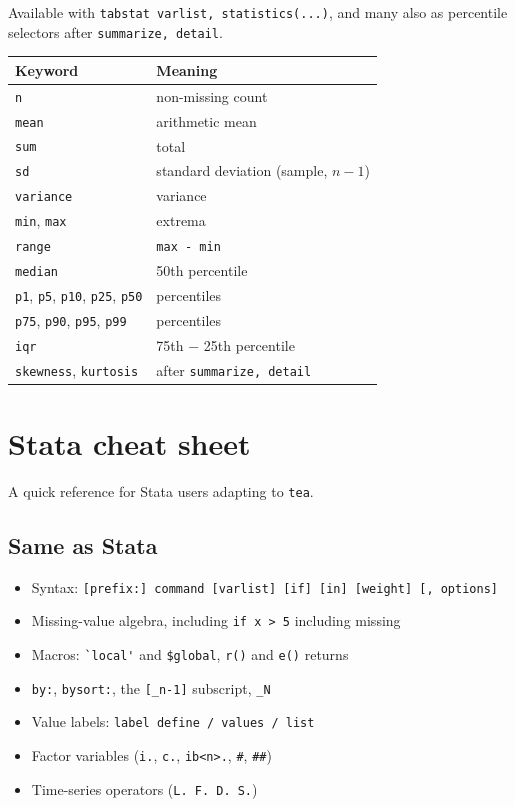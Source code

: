 \documentclass[11pt,letterpaper]{article}
\begin{document}
Available with \texttt{tabstat varlist, statistics(...)}, and many also
as percentile selectors after \texttt{summarize, detail}.

\begin{center}
\begin{tabular}{ll}
\toprule
Keyword & Meaning \\
\midrule
\texttt{n} & non-missing count \\
\texttt{mean} & arithmetic mean \\
\texttt{sum} & total \\
\texttt{sd} & standard deviation (sample, $n-1$) \\
\texttt{variance} & variance \\
\texttt{min}, \texttt{max} & extrema \\
\texttt{range} & \texttt{max - min} \\
\texttt{median} & 50th percentile \\
\texttt{p1}, \texttt{p5}, \texttt{p10}, \texttt{p25}, \texttt{p50} & percentiles \\
\texttt{p75}, \texttt{p90}, \texttt{p95}, \texttt{p99} & percentiles \\
\texttt{iqr} & 75th $-$ 25th percentile \\
\texttt{skewness}, \texttt{kurtosis} & after \texttt{summarize, detail} \\
\bottomrule
\end{tabular}
\end{center}

\section{Stata cheat sheet}

A quick reference for Stata users adapting to \texttt{tea}.

\subsection*{Same as Stata}

\begin{itemize}[leftmargin=*]
\item Syntax: \texttt{[prefix:] command [varlist] [if] [in] [weight] [, options]}
\item Missing-value algebra, including \texttt{if x > 5} including missing
\item Macros: \verb|`local'| and \texttt{\$global}, \texttt{r()} and
\texttt{e()} returns
\item \texttt{by:}, \texttt{bysort:}, the \texttt{[\_n-1]} subscript,
\texttt{\_N}
\item Value labels: \texttt{label define / values / list}
\item Factor variables (\texttt{i.}, \texttt{c.}, \texttt{ib<n>.},
\texttt{\#}, \texttt{\#\#})
\item Time-series operators (\texttt{L. F. D. S.})
\end{itemize}
\end{document}

